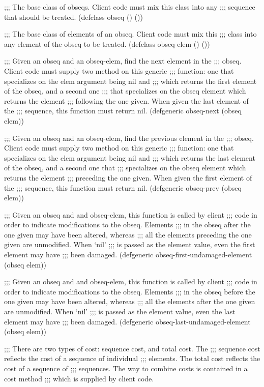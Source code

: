 
;;; The base class of obseqs.  Client code must mix this class into any 
;;; sequence that should be treated.  
(defclass obseq () ())

;;; The base class of elements of an obseq.  Client code must mix this
;;; class into any element of the obseq to be treated.
(defclass obseq-elem () ())

;;; Given an obseq and an obseq-elem, find the next element in the
;;; obseq.  Client code must supply two method on this generic
;;; function: one that specializes on the elem argument being nil and
;;; which returns the first element of the obseq, and a second one
;;; that specializes on the obseq element which returns the element
;;; following the one given.  When given the last element of the
;;; sequence, this function must return nil.
(defgeneric obseq-next (obseq elem))

;;; Given an obseq and an obseq-elem, find the previous element in the
;;; obseq.  Client code must supply two method on this generic
;;; function: one that specializes on the elem argument being nil and
;;; which returns the last element of the obseq, and a second one that
;;; specializes on the obseq element which returns the element
;;; preceding the one given.  When given the first element of the
;;; sequence, this function must return nil.
(defgeneric obseq-prev (obseq elem))

;;; Given an obseq and and obseq-elem, this function is called by client
;;; code in order to indicate modifications to the obseq.  Elements 
;;; in the obseq after the one given may have been altered, whereas 
;;; all the elements preceding the one given are unmodified.  When `nil'
;;; is passed as the element value, even the first element may have
;;;  been damaged. 
(defgeneric obseq-first-undamaged-element (obseq elem))

;;; Given an obseq and and obseq-elem, this function is called by client
;;; code in order to indicate modifications to the obseq.  Elements 
;;; in the obseq before the one given may have been altered, whereas 
;;; all the elements after the one given are unmodified.  When `nil'
;;; is passed as the element value, even the last element may have
;;;  been damaged. 
(defgeneric obseq-last-undamaged-element (obseq elem))

;;; There are two types of cost: sequence cost, and total cost.  The
;;; sequence cost reflects the cost of a sequence of individual
;;; elements.  The total cost reflects the cost of a sequence of
;;; sequences.  The way to combine costs is contained in a cost method 
;;; which is supplied by client code. 

